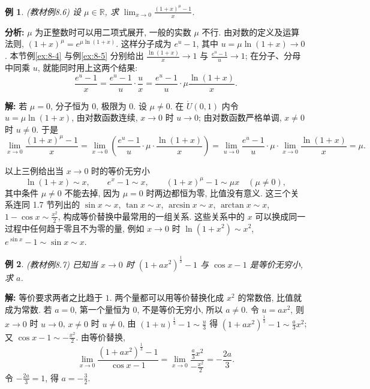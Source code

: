 \documentclass[UTF8,openany]{ctexbook}
\theoremstyle{chinesetextbook}
\newtheorem{example}{例}[section]
\newenvironment{cnsolution}{\par\indent\textbf{解:} \ignorespaces}{\par}
\begin{document}
\begin{example}\label{ex:8-6}
\textnormal{(教材例8.6)} 设 $\mu\in\mathbb R$, 求 $\displaystyle\lim_{x\to0}\frac{(1+x)^\mu-1}x$.
\end{example}
\par\indent\textbf{分析:} $\mu$ 为正整数时可以用二项式展开, 一般的实数 $\mu$ 不行. 由对数的定义及运算法则, $(1+x)^\mu=e^{\mu\ln(1+x)}$. 这样分子成为 $e^u-1$, 其中 $u=\mu\ln(1+x)\to0$. 本节例\ref{ex:8-4} 与例\ref{ex:8-5} 分别给出 $\displaystyle\frac{\ln(1+x)}x\to1$ 与 $\displaystyle\frac{e^u-1}u\to1$; 在分子、分母中同乘 $u$, 就能同时用上这两个结果:
\[
\frac{e^u-1}x=\frac{e^u-1}u\cdot\frac ux=\frac{e^u-1}u\cdot\mu\frac{\ln(1+x)}x.
\]
\begin{cnsolution}
若 $\mu=0$, 分子恒为 $0$, 极限为 $0$. 设 $\mu\ne0$. 在 $\mathring U(0,1)$ 内令 $u=\mu\ln(1+x)$, 由对数函数连续, $x\to0$ 时 $u\to0$; 由对数函数严格单调, $x\ne0$ 时 $u\ne0$. 于是
\[
\lim_{x\to0}\frac{(1+x)^\mu-1}x=\lim_{x\to0}\left(\frac{e^u-1}u\cdot\mu\cdot\frac{\ln(1+x)}x\right)=\lim_{u\to0}\frac{e^u-1}u\cdot\mu\cdot\lim_{x\to0}\frac{\ln(1+x)}x=\mu.
\]
\end{cnsolution}
以上三例给出当 $x\to0$ 时的等价无穷小
\[
\ln(1+x)\sim x,\qquad e^x-1\sim x,\qquad(1+x)^\mu-1\sim\mu x\quad(\mu\ne0),
\]
其中条件 $\mu\ne0$ 不能去掉, 因为 $\mu=0$ 时两边都恒为零, 比值没有意义. 这三个关系连同 1.7 节列出的 $\sin x\sim x$, $\tan x\sim x$, $\arcsin x\sim x$, $\arctan x\sim x$, $\displaystyle1-\cos x\sim\frac{x^2}2$, 构成等价替换中最常用的一组关系. 这些关系中的 $x$ 可以换成同一过程中任何趋于零且不为零的量, 例如 $x\to0$ 时 $\ln(1+x^2)\sim x^2$, $e^{\sin x}-1\sim\sin x\sim x$.
\begin{example}
\textnormal{(教材例8.7)} 已知当 $x\to0$ 时 $(1+ax^2)^{\frac13}-1$ 与 $\cos x-1$ 是等价无穷小, 求 $a$.
\end{example}
\begin{cnsolution}
等价要求两者之比趋于 $1$. 两个量都可以用等价替换化成 $x^2$ 的常数倍, 比值就成为常数. 若 $a=0$, 第一个量恒为 $0$, 不是等价无穷小, 所以 $a\ne0$. 令 $u=ax^2$, 则 $x\to0$ 时 $u\to0$, $x\ne0$ 时 $u\ne0$, 由 $\displaystyle(1+u)^{\frac13}-1\sim\frac u3$ 得 $\displaystyle(1+ax^2)^{\frac13}-1\sim\frac a3x^2$; 又 $\displaystyle\cos x-1\sim-\frac{x^2}2$. 由等价替换,
\[
\lim_{x\to0}\frac{(1+ax^2)^{\frac13}-1}{\cos x-1}=\lim_{x\to0}\frac{\frac a3x^2}{-\frac{x^2}2}=-\frac{2a}3.
\]
令 $\displaystyle-\frac{2a}3=1$, 得 $\displaystyle a=-\frac32$.
\end{cnsolution}
\end{document}

